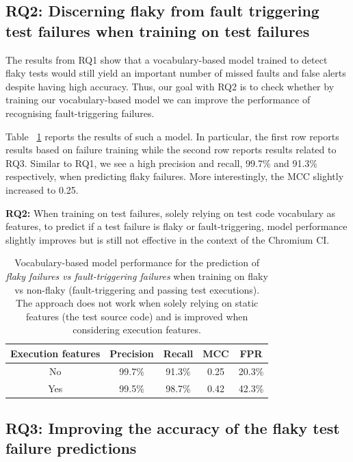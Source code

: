 \subsection{RQ2: Discerning flaky from fault triggering test failures when training on test failures}

The results from RQ1 show that a vocabulary-based model trained to detect flaky tests would still yield an important number of missed faults and false alerts despite having high accuracy. Thus, our goal with RQ2 is to check whether by training our vocabulary-based model we can improve the performance of recognising fault-triggering failures. 

Table ~\ref{table:rq2and3} reports the results of such a model. In particular, the first row reports results based on failure training while the second row reports results related to RQ3. Similar to RQ1, we see a high precision and recall, 99.7\% and 91.3\% respectively, when predicting flaky failures. More interestingly, the MCC slightly increased to 0.25. 

\begin{tcolorbox}[
    left=2pt,right=2pt,top=2pt,bottom=2pt,
    arc=0pt, 
    boxrule=1.2pt
]
\textbf{RQ2:} When training on test failures, solely relying on test code vocabulary as features, to predict if a test failure is flaky or fault-triggering, model performance slightly improves but is still not effective in the context of the Chromium CI.
\end{tcolorbox}

\begin{table}[ht]
\caption{Vocabulary-based model performance for the prediction of \textit{flaky failures vs fault-triggering failures} when training on flaky vs non-flaky (fault-triggering and passing test executions). The approach does not work when solely relying on static features (\ie the test source code) and is improved when considering execution features.}
\label{table:rq2and3}
\centering
\begin{tabular}{c|c|c|c|c} 
 \toprule
 \textbf{Execution features} & \textbf{Precision} & \textbf{Recall} & \textbf{MCC} & \textbf{FPR} \\ [0.5ex] 
 \midrule
 No & 99.7\% & 91.3\% & 0.25 & 20.3\%\\ 
 Yes & 99.5\% & 98.7\% & 0.42 & 42.3\%\\ 
 \bottomrule
\end{tabular}
\end{table} 


\subsection{RQ3: Improving the accuracy of the flaky test failure predictions}

